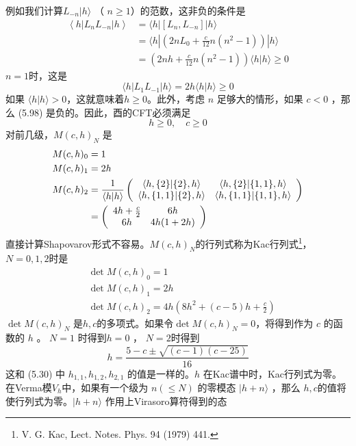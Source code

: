 例如我们计算$ L_{-n}|h\rangle$ （ $n\geq 1 $）的范数，这非负的条件是
\begin{equation}
	\begin{aligned} \left\langle h\left|L_{n} L_{-n}\right| h\right\rangle &= \langle h\left|\left[L_{n}, L_{-n}\right]\right| h \rangle \\ &= \langle h |\left(2 n L_{0}+\frac{c}{12} n\left(n^{2}-1\right)\right) | h \rangle \\ &=\left(2 n h+\frac{c}{12} n\left(n^{2}-1\right)\right)\langle h |h\rangle \geq 0 \end{aligned}
\end{equation}
$n=1 $时，这是
$$
\langle h|L_1L_{-1}|h\rangle=2h\langle h|h\rangle \geq0
$$
如果 $\langle h|h\rangle>0 $，这就意味着$ h\geq 0 $。此外，考虑 $n$ 足够大的情形，如果 $c<0$ ，那么 (5.98) 是负的。因此，酉的CFT必须满足
\begin{equation}
	h \geq 0, \quad c \geq 0
\end{equation}
对前几级，$ M(c, h)_{N}$ 是
\begin{align} M(c, h)_{0} &=1\\ M(c, h)_{1} &=2 h \\ M(c, h)_{2} &=\frac{1}{\langle h | h\rangle}\left(\begin{array}{cc} \langle h,\{2\} |\{2\}, h\rangle & \langle h,\{2\} |\{1,1\}, h\rangle \\ \langle h,\{1,1\} |\{2\}, h\rangle & \langle h,\{1,1\} |\{1,1\}, h\rangle \end{array}\right) \notag\\ &=\left(\begin{array}{cc} 4 h+\frac{c}{2} & 6 h \\ 6 h & 4 h(1+2 h) \end{array}\right)  \end{align}
直接计算Shapovarov形式不容易。$ M(c, h)_{N} $的行列式称为Kac行列式\footnote{V. G. Kac, Lect. Notes. Phys. 94 (1979) 441.}，$ N=0,1,2 $时是
\begin{align} &\det M(c, h)_{0}=1 \\ &\det M(c, h)_{1}=2 h \\ &\det M(c, h)_{2}=4 h\left(8 h^{2}+(c-5) h+\frac{c}{2}\right)  \end{align}
$\det M(c, h)_{N}$ 是$ h,c $的多项式。如果令$ \det M(c, h)_{N}=0 $，将得到作为 $c$ 的函数的 $h$ 。 $N=1$ 时得到$ h=0$ ， $N=2 $时得到
$$
h=\frac{5-c \pm \sqrt{(c-1)(c-25)}}{16}
$$
这和 (5.30) 中 $h_{1,1},h_{1,2},h_{2,1}$ 的值是一样的。$ h$ 在Kac谱中时，Kac行列式为零。在Verma模$ V_h $中，如果有一个级为 $n(\leq N)$ 的零模态 $|h+n\rangle$ ，那么 $h,c $的值将使行列式为零。$ |h+n\rangle$ 作用上Virasoro算符得到的态
